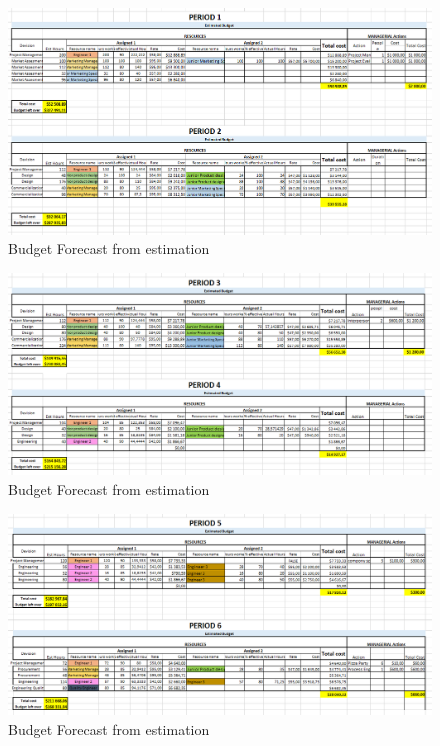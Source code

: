 \begin{appendices}
\begin{landscape}
\begin{figure}[H]
\includegraphics[scale=0.8]{budget_forecast_est_12.PNG}
\caption{Budget Forecast from estimation}
\end{figure}
\begin{figure}[H]
\includegraphics[scale=0.8]{budget_forecast_est_34.PNG}
\caption{Budget Forecast from estimation}
\end{figure}
\begin{figure}[H]
\includegraphics[scale=0.8]{budget_forecast_est_56.PNG}
\caption{Budget Forecast from estimation}
\end{figure}
\begin{figure}[H]

\end{figure}
\end{landscape}
\end{appendices}
